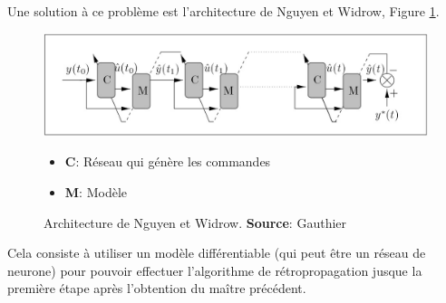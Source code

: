 Une solution à ce problème est l'architecture de Nguyen et Widrow, Figure \ref{appNguyenWidrow}.
\begin{figure}
 \centering
 \includegraphics[scale=0.5]{../figures/appNguyenWidrow.jpg}
 \begin{itemize}
  \item \textbf{C}: Réseau qui génère les commandes
  \item \textbf{M}: Modèle
 \end{itemize}
 \caption{Architecture de Nguyen et Widrow. \textbf{Source}: Gauthier\cite{Gauthier}}
 \label{appNguyenWidrow}
\end{figure}
Cela consiste à utiliser un modèle différentiable (qui peut être un réseau de neurone) pour pouvoir effectuer l'algorithme de rétropropagation jusque la première étape après l'obtention du maître précédent.